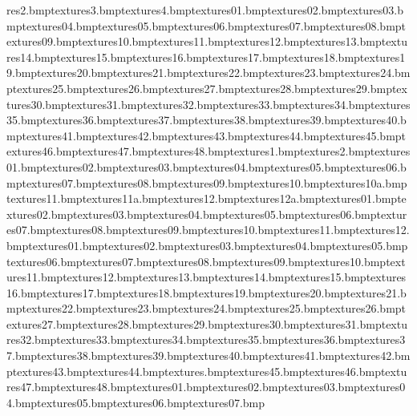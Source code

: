 res\sandedge2.bmp textures\sandedge3.bmp textures\sandedge4.bmp textures\sandrock01.bmp textures\sandrock02.bmp textures\sandrock03.bmp textures\sandrock04.bmp textures\sandrock05.bmp textures\sandrock06.bmp textures\sandrock07.bmp textures\sandrock08.bmp textures\sandrock09.bmp textures\sandrock10.bmp textures\sandrock11.bmp textures\sandrock12.bmp textures\sandrock13.bmp textures\sandrock14.bmp textures\sandrock15.bmp textures\sandrock16.bmp textures\sandrock17.bmp textures\sandrock18.bmp textures\sandrock19.bmp textures\sandrock20.bmp textures\sandrock21.bmp textures\sandrock22.bmp textures\sandrock23.bmp textures\sandrock24.bmp textures\sandrock25.bmp textures\sandrock26.bmp textures\sandrock27.bmp textures\sandrock28.bmp textures\sandrock29.bmp textures\sandrock30.bmp textures\sandrock31.bmp textures\sandrock32.bmp textures\sandrock33.bmp textures\sandrock34.bmp textures\sandrock35.bmp textures\sandrock36.bmp textures\sandrock37.bmp textures\sandrock38.bmp textures\sandrock39.bmp textures\sandrock40.bmp textures\sandrock41.bmp textures\sandrock42.bmp textures\sandrock43.bmp textures\sandrock44.bmp textures\sandrock45.bmp textures\sandrock46.bmp textures\sandrock47.bmp textures\sandrock48.bmp textures\sandstep1.bmp textures\sandstep2.bmp textures\sdomestrip01.bmp textures\sdomestrip02.bmp textures\sdomestrip03.bmp textures\sdomestrip04.bmp textures\sdomestrip05.bmp textures\sdomestrip06.bmp textures\sdomestrip07.bmp textures\sdomestrip08.bmp textures\sdomestrip09.bmp textures\sdomestrip10.bmp textures\sdomestrip10a.bmp textures\sdomestrip11.bmp textures\sdomestrip11a.bmp textures\sdomestrip12.bmp textures\sdomestrip12a.bmp textures\sdomestripi01.bmp textures\sdomestripi02.bmp textures\sdomestripi03.bmp textures\sdomestripi04.bmp textures\sdomestripi05.bmp textures\sdomestripi06.bmp textures\sdomestripi07.bmp textures\sdomestripi08.bmp textures\sdomestripi09.bmp textures\sdomestripi10.bmp textures\sdomestripi11.bmp textures\sdomestripi12.bmp textures\sharprock01.bmp textures\sharprock02.bmp textures\sharprock03.bmp textures\sharprock04.bmp textures\sharprock05.bmp textures\sharprock06.bmp textures\sharprock07.bmp textures\sharprock08.bmp textures\sharprock09.bmp textures\sharprock10.bmp textures\sharprock11.bmp textures\sharprock12.bmp textures\sharprock13.bmp textures\sharprock14.bmp textures\sharprock15.bmp textures\sharprock16.bmp textures\sharprock17.bmp textures\sharprock18.bmp textures\sharprock19.bmp textures\sharprock20.bmp textures\sharprock21.bmp textures\sharprock22.bmp textures\sharprock23.bmp textures\sharprock24.bmp textures\sharprock25.bmp textures\sharprock26.bmp textures\sharprock27.bmp textures\sharprock28.bmp textures\sharprock29.bmp textures\sharprock30.bmp textures\sharprock31.bmp textures\sharprock32.bmp textures\sharprock33.bmp textures\sharprock34.bmp textures\sharprock35.bmp textures\sharprock36.bmp textures\sharprock37.bmp textures\sharprock38.bmp textures\sharprock39.bmp textures\sharprock40.bmp textures\sharprock41.bmp textures\sharprock42.bmp textures\sharprock43.bmp textures\sharprock44.bmp textures\sign.bmp textures\sharprock45.bmp textures\sharprock46.bmp textures\sharprock47.bmp textures\sharprock48.bmp textures\sign01.bmp textures\sign02.bmp textures\sign03.bmp textures\sign04.bmp textures\sign05.bmp textures\sign06.bmp textures\sign07.bmp